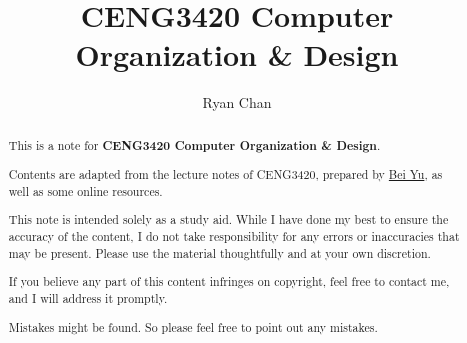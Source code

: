 \documentclass[a4paper]{report}
\author{Ryan Chan}
\title{CENG3420 Computer Organization \& Design}
\begin{document}
\setlength\parindent{0pt}

\maketitle

\newpage

\begin{abstract}
	This is a note for \textbf{CENG3420 Computer Organization \& Design}. 
	
	Contents are adapted from the lecture notes of CENG3420, prepared by \href{https://www.cse.cuhk.edu.hk/~byu/}{Bei Yu}, as well as some online resources.
	
	This note is intended solely as a study aid. While I have done my best to ensure the accuracy of the content, I do not take responsibility for any errors or inaccuracies that may be present. Please use the material thoughtfully and at your own discretion.
	
	If you believe any part of this content infringes on copyright, feel free to contact me, and I will address it promptly.

	Mistakes might be found. So please feel free to point out any mistakes.
\end{abstract}

\newpage

\tableofcontents

\setlength{\parskip}{5pt}
\end{document}
